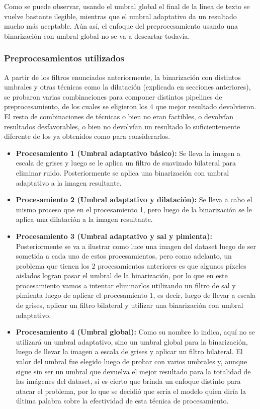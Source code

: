 \documentclass{article}
\begin{document}
Como se puede observar, usando el umbral global el final de la línea de texto se vuelve bastante ilegible, mientras que el umbral adaptativo da un resultado mucho más aceptable. Aún así, el enfoque del preprocesamiento usando una binarización con umbral global no se va a descartar todavía.

\subsubsection{Preprocesamientos utilizados}

A partir de los filtros enunciados anteriormente, la binarización con distintos umbrales y otras técnicas como la dilatación (explicada en secciones anteriores), se probaron varias combinaciones para componer distintos pipelines de preprocesamiento, de los cuales se eligieron los 4 que mejor resultado devolvieron. El resto de combinaciones de técnicas o bien no eran factibles, o devolvían resultados desfavorables, o bien no devolvían un resultado lo suficientemente diferente de los ya obtenidos como para considerarlos.

\newpage

\begin{itemize}
    \item \textbf{Procesamiento 1 (Umbral adaptativo básico):} Se lleva la imagen a escala de grises y luego se le aplica un filtro de suavizado bilateral para eliminar ruido. Posteriormente se aplica una binarización con umbral adaptativo a la imagen resultante.

    \item \textbf{Procesamiento 2 (Umbral adaptativo y dilatación):} Se lleva a cabo el mismo proceso que en el procesamiento 1, pero luego de la binarización se le aplica una dilatación a la imagen resultante.

    \item \textbf{Procesamiento 3 (Umbral adaptativo y sal y pimienta):} Posteriormente se va a ilustrar como luce una imagen del dataset luego de ser sometida a cada uno de estos procesamientos, pero como adelanto, un problema que tienen los 2 procesamientos anteriores es que algunos píxeles aislados logran pasar el umbral de la binarización, por lo que en este procesamiento vamos a intentar eliminarlos utilizando un filtro de sal y pimienta luego de aplicar el procesamiento 1, es decir, luego de llevar a escala de grises, aplicar un filtro bilateral y utilizar una binarización con umbral adaptativo.

    \item \textbf{Procesamiento 4 (Umbral global):} Como su nombre lo indica, aquí no se utilizará un umbral adaptativo, sino un umbral global para la binarización, luego de llevar la imagen a escala de grises y aplicar un filtro bilateral. El valor del umbral fue elegido luego de probar con varios umbrales y, aunque sigue sin ser un umbral que devuelva el mejor resultado para la totalidad de las imágenes del dataset, si es cierto que brinda un enfoque distinto para atacar el problema, por lo que se decidió que sería el modelo quien diría la última palabra sobre la efectividad de esta técnica de procesamiento.
\end{itemize}
\end{document}
